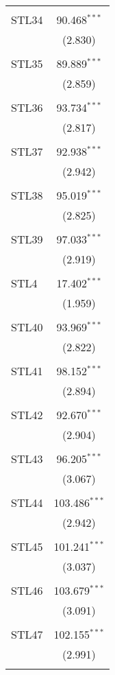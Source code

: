 \begin{table}[!htbp]
\begin{tabular}{@{\extracolsep{5pt}}lc}
  & \\ 
 STL34 & 90.468$^{***}$ \\ 
  & (2.830) \\ 
  & \\ 
 STL35 & 89.889$^{***}$ \\ 
  & (2.859) \\ 
  & \\ 
 STL36 & 93.734$^{***}$ \\ 
  & (2.817) \\ 
  & \\ 
 STL37 & 92.938$^{***}$ \\ 
  & (2.942) \\ 
  & \\ 
 STL38 & 95.019$^{***}$ \\ 
  & (2.825) \\ 
  & \\ 
 STL39 & 97.033$^{***}$ \\ 
  & (2.919) \\ 
  & \\ 
 STL4 & 17.402$^{***}$ \\ 
  & (1.959) \\ 
  & \\ 
 STL40 & 93.969$^{***}$ \\ 
  & (2.822) \\ 
  & \\ 
 STL41 & 98.152$^{***}$ \\ 
  & (2.894) \\ 
  & \\ 
 STL42 & 92.670$^{***}$ \\ 
  & (2.904) \\ 
  & \\ 
 STL43 & 96.205$^{***}$ \\ 
  & (3.067) \\ 
  & \\ 
 STL44 & 103.486$^{***}$ \\ 
  & (2.942) \\ 
  & \\ 
 STL45 & 101.241$^{***}$ \\ 
  & (3.037) \\ 
  & \\ 
 STL46 & 103.679$^{***}$ \\ 
  & (3.091) \\ 
  & \\ 
 STL47 & 102.155$^{***}$ \\ 
  & (2.991) \\ 
  & \\ 

\end{tabular}
\end{table}
